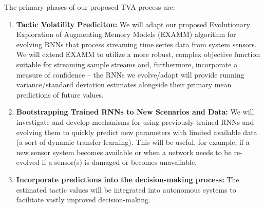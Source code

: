 \documentclass[12pt]{article}
\newcommand{\dan}[1]{\textcolor{blue}{{\it [Dan: #1]}}}
\begin{document}
The primary phases of our proposed TVA process are:
\vspace{-1mm}
\begin{enumerate}[noitemsep]

\item \textbf{Tactic Volatility Prediciton: } We will adapt our proposed Evolutionary Exploration of Augmenting Memory Models (EXAMM) algorithm for evolving RNNs that process streaming time series data from system sensors.  We will extend EXAMM to utilize a more robust, complex objective function suitable for streaming sample streams and, furthermore, incorporate a measure of confidence -- the RNNs we evolve/adapt will provide running variance/standard deviation estimates alongside their primary mean predictions of future values.

\item \textbf{Bootstrapping Trained RNNs to New Scenarios and Data:} We will investigate and develop mechanisms for using previously-trained RNNs and evolving them to quickly predict new parameters with limited available data (a sort of dynamic transfer learning). This will be useful, for example, if a new sensor system becomes available or when a network needs to be re-evolved if a sensor(s) is damaged or becomes unavailable.

\item \textbf{Incorporate predictions into the decision-making process:} The estimated tactic values will be integrated into autonomous systems to facilitate vastly improved decision-making.




	
\end{enumerate}
\end{document}
